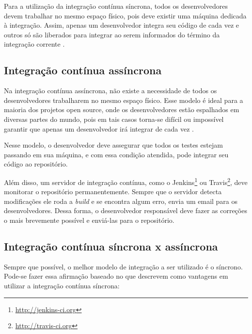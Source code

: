 Para a utilização da integração contínua síncrona, todos os desenvolvedores devem trabalhar no mesmo espaço físico, pois deve existir uma máquina dedicada à integração. Assim, apenas um desenvolvedor integra seu código de cada vez e outros só são liberados para integrar ao serem informados do término da integração corrente \cite{ImproveitCI}.



\subsection{Integração contínua assíncrona} %
\label{sub:integracao_continua_assincrona}

Na integração contínua assíncrona, não existe a necessidade de todos os desenvolvedores trabalharem no mesmo espaço físico. Esse modelo é ideal para a maioria dos projetos open source, onde os desenvolvedores estão espalhados em diversas partes do mundo, pois em tais casos torna-se difícil ou impossível garantir que apenas um desenvolvedor irá integrar de cada vez \cite{ImproveitCI}.

Nesse modelo, o desenvolvedor deve assegurar que todos os testes estejam passando em sua máquina, e com essa condição atendida, pode integrar seu código ao repositório.

Além disso, um servidor de integração contínua, como o Jenkins\footnote{\url{http://jenkins-ci.org}} ou Travis\footnote{\url{http://travis-ci.org}}, deve monitorar o repositório permanentemente. Sempre que o servidor detecta modificações ele roda a \textit{build} e se encontra algum erro, envia um email para os desenvolvedores. Dessa forma, o desenvolvedor responsável deve fazer as correções o mais brevemente possível e enviá-las para o repositório.


\subsection{Integração contínua síncrona x assíncrona} %
\label{sub:sincrona_x_assincrona}

Sempre que possível, o melhor modelo de integração a ser utilizado é o síncrono. Pode-se fazer essa afirmação baseado no que  descrevem como vantagens em utilizar a integração contínua síncrona:

